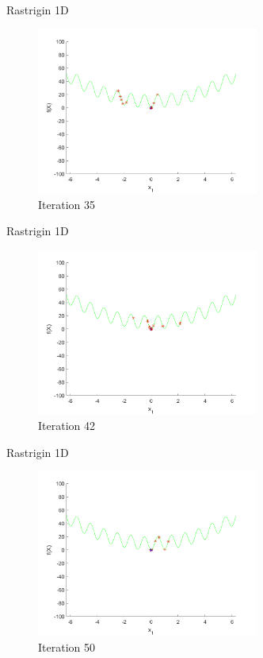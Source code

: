 \documentclass[xcolor=table]{beamer}
\begin{document}
\begin{frame}{Rastrigin 1D}
  \begin{figure}[h]
  \begin{center}
    \includegraphics[width=0.65\textwidth]{img/smpl/rast1d/loa-iter-35}
    \caption{Iteration 35}
  \end{center}
  \end{figure}
\end{frame}
\begin{frame}{Rastrigin 1D}
  \begin{figure}[h]
  \begin{center}
    \includegraphics[width=0.65\textwidth]{img/smpl/rast1d/loa-iter-42}
    \caption{Iteration 42}
  \end{center}
  \end{figure}
\end{frame}
\begin{frame}{Rastrigin 1D}
  \begin{figure}[h]
  \begin{center}
    \includegraphics[width=0.65\textwidth]{img/smpl/rast1d/loa-iter-50}
    \caption{Iteration 50}
  \end{center}
  \end{figure}
\end{frame}
\end{document}
